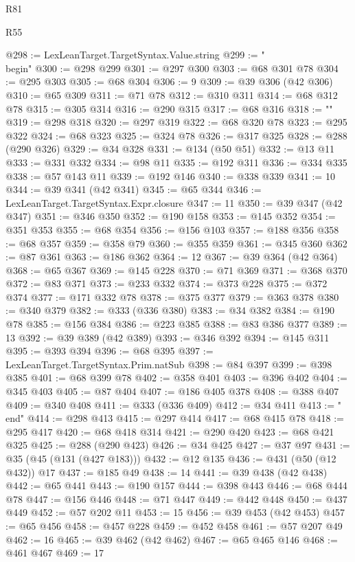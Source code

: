 \begin{lexlean}{R81}
\begin{lexlean}{R55}
\begin{coremodule}
{{{{{{{{{{{{{{{{{{{{{{{{{{{{{{{{{{{{{{{{{{{{{{{{{{{{{{{{{{{{@298 := LexLeanTarget.TargetSyntax.Value.string
@299 := "\\begin{"
@300 := @298 @299
@301 := @297 @300
@303 := @68 @301 @78
@304 := @295 @303
@305 := @68 @304
@306 := 9
@309 := @39 @306 (@42 @306)
@310 := @65 @309
@311 := @71 @78
@312 := @310 @311
@314 := @68 @312 @78
@315 := @305 @314
@316 := @290 @315
@317 := @68 @316
@318 := "}"
@319 := @298 @318
@320 := @297 @319
@322 := @68 @320 @78
@323 := @295 @322
@324 := @68 @323
@325 := @324 @78
@326 := @317 @325
@328 := @288 (@290 @326)
@329 := @34 @328
@331 := @134 (@50 @51)
@332 := @13 @11
@333 := @331 @332
@334 := @98 @11
@335 := @192 @311
@336 := @334 @335
@338 := @57 @143 @11
@339 := @192 @146
@340 := @338 @339
@341 := 10
@344 := @39 @341 (@42 @341)
@345 := @65 @344
@346 := LexLeanTarget.TargetSyntax.Expr.closure
@347 := 11
@350 := @39 @347 (@42 @347)
@351 := @346 @350
@352 := @190 @158
@353 := @145 @352
@354 := @351 @353
@355 := @68 @354
@356 := @156 @103
@357 := @188 @356
@358 := @68 @357
@359 := @358 @79
@360 := @355 @359
@361 := @345 @360
@362 := @87 @361
@363 := @186 @362
@364 := 12
@367 := @39 @364 (@42 @364)
@368 := @65 @367
@369 := @145 @228
@370 := @71 @369
@371 := @368 @370
@372 := @83 @371
@373 := @233 @332
@374 := @373 @228
@375 := @372 @374
@377 := @171 @332 @78
@378 := @375 @377
@379 := @363 @378
@380 := @340 @379
@382 := @333 (@336 @380)
@383 := @34 @382
@384 := @190 @78
@385 := @156 @384
@386 := @223 @385
@388 := @83 @386 @377
@389 := 13
@392 := @39 @389 (@42 @389)
@393 := @346 @392
@394 := @145 @311
@395 := @393 @394
@396 := @68 @395
@397 := LexLeanTarget.TargetSyntax.Prim.natSub
@398 := @84 @397
@399 := @398 @385
@401 := @68 @399 @78
@402 := @358 @401
@403 := @396 @402
@404 := @345 @403
@405 := @87 @404
@407 := @186 @405 @378
@408 := @388 @407
@409 := @340 @408
@411 := @333 (@336 @409)
@412 := @34 @411
@413 := "\\end{"
@414 := @298 @413
@415 := @297 @414
@417 := @68 @415 @78
@418 := @295 @417
@420 := @68 @418 @314
@421 := @290 @420
@423 := @68 @421 @325
@425 := @288 (@290 @423)
@426 := @34 @425
@427 := @37 @97
@431 := @35 (@45 (@131 (@427 @183)))
@432 := @12 @135
@436 := @431 (@50 (@12 @432)) @17
@437 := @185 @49
@438 := 14
@441 := @39 @438 (@42 @438)
@442 := @65 @441
@443 := @190 @157
@444 := @398 @443
@446 := @68 @444 @78
@447 := @156 @446
@448 := @71 @447
@449 := @442 @448
@450 := @437 @449
@452 := @57 @202 @11
@453 := 15
@456 := @39 @453 (@42 @453)
@457 := @65 @456
@458 := @457 @228
@459 := @452 @458
@461 := @57 @207 @49
@462 := 16
@465 := @39 @462 (@42 @462)
@467 := @65 @465 @146
@468 := @461 @467
@469 := 17
}}}}}}}}}}}}}}}}}}}}}}}}}}}}}}}}}}}}}}}}}}}}}}}}}}}}}}}}}}}}}
\end{coremodule}
\end{lexlean}
\end{lexlean}
